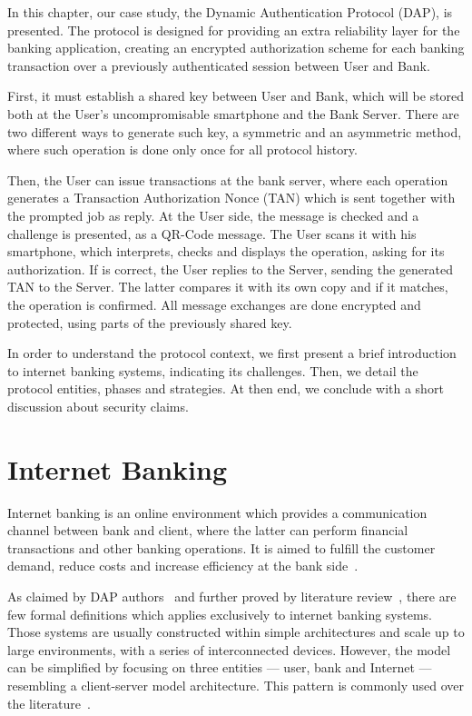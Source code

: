 In this chapter\label{chap:dap}, our case study, the Dynamic Authentication Protocol (DAP), is presented. The protocol is designed for providing an extra reliability layer for the banking application, creating an encrypted authorization scheme for each banking transaction over a previously authenticated session between User and Bank.

First, it must establish a shared key between User and Bank, which will be stored both at the User's uncompromisable smartphone and the Bank Server. There are two different ways to generate such key, a symmetric and an asymmetric method, where such operation is done only once for all protocol history.

Then, the User can issue transactions at the bank server, where each operation generates a Transaction Authorization Nonce (TAN) which is sent together with the prompted job as reply. At the User side, the message is checked and a challenge is presented, as a QR-Code message. The User scans it with his smartphone, which interprets, checks and displays the operation, asking for its authorization. If is correct, the User replies to the Server, sending the generated TAN to the Server. The latter compares it with its own copy and if it matches, the operation is confirmed. All message exchanges are done encrypted and protected, using parts of the previously shared key.

In order to understand the protocol context, we first present a brief introduction to internet banking systems, indicating its challenges. Then, we detail the protocol entities, phases and strategies. At then end, we conclude with a short discussion about security claims.





\section{Internet Banking}
Internet banking is an online environment which provides a communication channel between bank and client, where the latter can perform financial transactions and other banking operations. It is aimed to fulfill the customer demand, reduce costs and increase efficiency at the bank side~\cite{Hutchinson2003}.

As claimed by DAP authors~\cite[p.8]{Peotta2012} and further proved by literature review~\cite{Hutchinson2003}, there are few formal definitions which applies exclusively to internet banking systems. Those systems are usually constructed within simple architectures and scale up to large environments, with a series of interconnected devices. However, the model can be simplified by focusing on three entities --- user, bank and Internet --- resembling a client-server model architecture. This pattern is commonly used over the literature~\cite{Hutchinson2003}.

